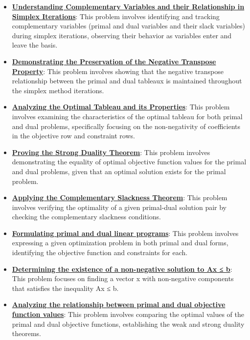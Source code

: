 \documentclass{article}%
\begin{document}
\begin{itemize}[leftmargin=*]
\item \href{https://www.math.purdue.edu/~yipn/421/2024-09-12-Duality.pdf#page=5}{\textbf{Understanding Complementary Variables and their Relationship in Simplex Iterations}}: This problem involves identifying and tracking complementary variables (primal and dual variables and their slack variables) during simplex iterations, observing their behavior as variables enter and leave the basis. %
\item \href{https://www.math.purdue.edu/~yipn/421/2024-09-12-Duality.pdf#page=6}{\textbf{Demonstrating the Preservation of the Negative Transpose Property}}: This problem involves showing that the negative transpose relationship between the primal and dual tableaux is maintained throughout the simplex method iterations. %
\item \href{https://www.math.purdue.edu/~yipn/421/2024-09-12-Duality.pdf#page=9}{\textbf{Analyzing the Optimal Tableau and its Properties}}: This problem involves examining the characteristics of the optimal tableau for both primal and dual problems, specifically focusing on the non-negativity of coefficients in the objective row and constraint rows. %
\item \href{https://www.math.purdue.edu/~yipn/421/2024-09-12-Duality.pdf#page=11}{\textbf{Proving the Strong Duality Theorem}}: This problem involves demonstrating the equality of optimal objective function values for the primal and dual problems, given that an optimal solution exists for the primal problem. %
\item \href{https://www.math.purdue.edu/~yipn/421/2024-09-12-Duality.pdf#page=21}{\textbf{Applying the Complementary Slackness Theorem}}: This problem involves verifying the optimality of a given primal-dual solution pair by checking the complementary slackness conditions. %
\item \href{https://www.math.purdue.edu/~yipn/421/2024-09-17-DualityGeneral.pdf#page=1}{\textbf{Formulating primal and dual linear programs}}: This problem involves expressing a given optimization problem in both primal and dual forms, identifying the objective function and constraints for each. %
\item \href{https://www.math.purdue.edu/~yipn/421/2024-09-17-DualityGeneral.pdf#page=11}{\textbf{Determining the existence of a non{-}negative solution to Ax ≤ b}}: This problem focuses on finding a vector x with non-negative components that satisfies the inequality Ax ≤ b. %
\item \href{https://www.math.purdue.edu/~yipn/421/2024-09-17-DualityGeneral.pdf#page=5}{\textbf{Analyzing the relationship between primal and dual objective function values}}: This problem involves comparing the optimal values of the primal and dual objective functions, establishing the weak and strong duality theorems. %

\end{itemize}
\end{document}
